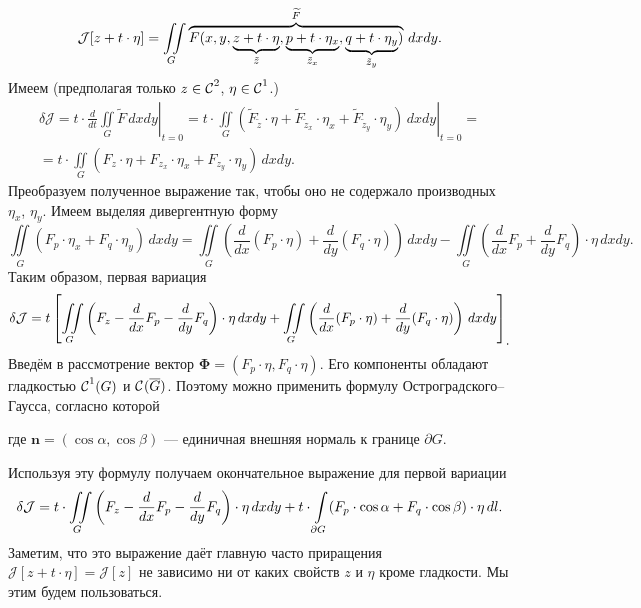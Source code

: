\documentclass[12pt,a4paper,openany,fleqn]{book}
\newcommand{\R}{\ensuremath{\mathbb{R}}}
\newcommand{\Cf}{\ensuremath{\mathcal{C}}}
\newcommand{\J}{\ensuremath{\mathcal{J}}}
\newcommand{\Cfn}[2][]{\ensuremath{\Cf{\mathstrut}^{#2}_{#1}}}
\newcommand{\der}[2]{\ensuremath{\frac{d#1}{d#2}}}
\DeclareMathOperator{\Div}{div}
\theoremstyle{definition}
\begin{document}
	\begin{equation*}
		\hfill\J[z+t\cdot\eta]=\iint\limits_{G}\overbrace{F(x,y,\underbrace{z+t\cdot\eta}_{\tilde{z}},\underbrace{p+t\cdot\eta_x}_{\tilde{z}_x},\underbrace{q+t\cdot\eta_y}_{\tilde{z}_y})}^{\widetilde{F}}\,dxdy.\hfill
	\end{equation*}
	Имеем (предполагая только $z\in\Cfn{2}$, $\eta\in\Cfn{1}$.)
	\begin{multline*}
		\delta\J=\left.t\cdot\der{}{t}\iint\limits_{G}\widetilde{F}\,dxdy\right|_{t=0}=\left.t\cdot\iint\limits_{G}\left(\widetilde{F}_{\tilde{z}}\cdot\eta+\widetilde{F}_{\tilde{z}_x}\cdot\eta_x+\widetilde{F}_{\tilde{z}_y}\cdot\eta_y\right)\,dxdy\right|_{t=0}=\\=t\cdot\iint\limits_{G}\left({F}_{z}\cdot\eta+{F}_{z_x}\cdot\eta_x+{F}_{z_y}\cdot\eta_y\right)\,dxdy.
	\end{multline*}
	Преобразуем полученное выражение так, чтобы оно не содержало производных $\eta_x$, $\eta_y$. Имеем выделяя дивергентную форму 
	\begin{equation*}
		\iint\limits_{G}\left(F_p\cdot\eta_x+F_q\cdot\eta_y\right)\,dxdy=\iint\limits_{G}\left(\der{}{x}(F_p\cdot\eta)+\der{}{y}(F_q\cdot\eta)\right)\,dxdy-\iint\limits_{G}\left(\der{}{x}F_p+\der{}{y}F_q\right)\cdot\eta\,dxdy.
	\end{equation*}
	Таким образом, первая вариация
	\begin{equation*}
		\hfill\delta\J=t\left[\iint\limits_{G}\left(F_z-\der{}{x}F_p-\der{}{y}F_q\right)\cdot\eta\,dxdy+\iint\limits_{G}\left(\der{}{x}(F_p\cdot\eta)+\der{}{y}(F_q\cdot\eta)\right)\,dxdy\right]_{\displaystyle.}\hfill
	\end{equation*}
	Введём в рассмотрение вектор $\bm{\Phi}=(F_p\cdot\eta,F_q\cdot\eta)$. Его компоненты обладают гладкостью $\Cfn{1}(G)$ и $\Cfn{}(\overline{G})$. Поэтому можно применить формулу Остроградского--Гаусса, согласно которой
	\begin{center}
		\fbox{\parbox{0.32\textwidth}{$\displaystyle\iint\limits_{G}\Div\bm{\Phi}\,dxdy=\int\limits_{\partial G}\big(\bm{\Phi},\bm{n}\big)_{\R^2}\,dl,$}}
	\end{center}
	где $\bm{n}=(\cos\alpha,\cos\beta)$ --- единичная внешняя нормаль к границе $\partial G$.
	
	\noindent Используя эту формулу получаем окончательное выражение для первой вариации
	\begin{equation}\label{l9:eq:10}
		\hfill\delta\J=t\cdot\iint\limits_{G}\left(F_z-\der{}{x}F_p-\der{}{y}F_q\right)\cdot\eta\,dxdy+t\cdot\int\limits_{\partial G}(F_p\cdot\cos\alpha+F_q\cdot\cos\beta)\cdot\eta\,dl.\hfill
	\end{equation}
	Заметим, что это выражение даёт главную часто приращения $\J[z+t\cdot\eta]=\J[z]$ не зависимо ни от каких свойств $z$ и $\eta$ кроме гладкости. Мы этим будем пользоваться.
	
\end{document}
